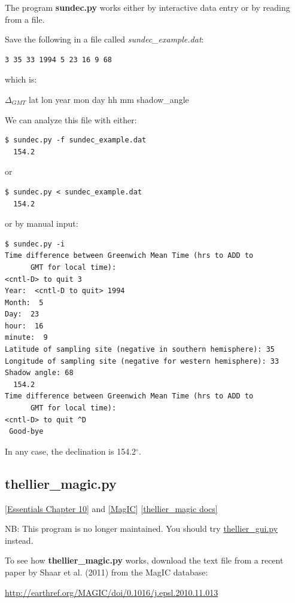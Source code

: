 \documentclass[11pt]{book}
\begin{document}
{The program {\bf sundec.py}  works either by interactive data entry or by reading from a file.

Save the following in a file called {\it sundec\_example.dat}:

\begin{verbatim}
3 35 33 1994 5 23 16 9 68
\end{verbatim}
which is:

$\Delta_{GMT}$ lat lon year mon day hh mm shadow\_angle

We can analyze this file with either:

\begin{verbatim}
$ sundec.py -f sundec_example.dat
  154.2
\end{verbatim}
or
\begin{verbatim}
$ sundec.py < sundec_example.dat
  154.2
\end{verbatim}
or by manual input:
\begin{verbatim}
$ sundec.py -i
Time difference between Greenwich Mean Time (hrs to ADD to
      GMT for local time):
<cntl-D> to quit 3
Year:  <cntl-D to quit> 1994
Month:  5
Day:  23
hour:  16
minute:  9
Latitude of sampling site (negative in southern hemisphere): 35
Longitude of sampling site (negative for western hemisphere): 33
Shadow angle: 68
  154.2
Time difference between Greenwich Mean Time (hrs to ADD to
      GMT for local time):
<cntl-D> to quit ^D
 Good-bye

\end{verbatim}

In any case, the declination is 154.2$^{\circ}$.


\subsection{thellier\_magic.py}
\href{http://earthref.org/MAGIC/books/Tauxe/Essentials/WebBook3ch10.html#ch10}{ [Essentials Chapter 10]} and \href{#MagIC}{[MagIC}]
\href{https://github.com/PmagPy/PmagPy/blob/master/programs/thellier_magic.py}{[thellier\_magic docs]}

NB:  This program is no longer maintained.  You should try \href{#thellier_GUI.py}{thellier\_gui.py} instead.

To see how {\bf thellier\_magic.py}  works, download the text file from a recent paper by Shaar et al. (2011) from the MagIC database:

\nocite{shaar11}
\url{http://earthref.org/MAGIC/doi/0.1016/j.epsl.2010.11.013}

}
\end{document}
